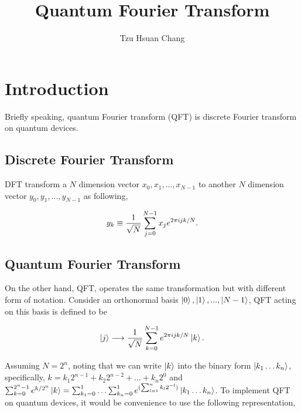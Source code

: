 \documentclass[a4paper]{article}
\title{Quantum Fourier Transform}
\author{Tzu Hsuan Chang}
\begin{document}
\maketitle

\section{Introduction}
\label{sec:Intro}
Briefly speaking, quantum Fourier transform (QFT) is discrete Fourier transform on quantum devices.


\subsection*{Discrete Fourier Transform}
\label{subsec:dft}
DFT transform a $N$ dimension vector $x_0, x_1, ... ,x_{N-1}$ to another $N$ dimension vector $y_0, y_1, ... ,y_{N-1}$ as following,

    \begin{equation} \label{eq1}
    \setlength{\jot}{10pt}
    \begin{aligned}
        \large y_k \equiv \frac{1}{\sqrt{N}} \sum_{j=0}^{N-1} x_j e^{2\pi ijk / N}.
    \end{aligned}
    \end{equation}


\subsection*{Quantum Fourier Transform}
\label{subsec:qft}
On the other hand, QFT, operates the same transformation but with different form of notation. Consider an orthonormal basis $\ket{0}, \ket{1}, ... ,\ket{N-1}$, QFT acting on this basis is defined to be

    \begin{equation} \label{eq2}
    \setlength{\jot}{10pt}
    \begin{aligned}
        \ket{j} \longrightarrow \frac{1}{\sqrt{N}} \sum_{k=0}^{N-1} e^{2 \pi i j k / N} \ket{k}.
    \end{aligned}
    \end{equation}

Assuming $N = 2^n$, noting that we can write $\ket{k}$ into the binary form 
$\ket{k_1 \dotso k_n}$, specifically, $k = k_1 2^{n-1} + k_2 2^{n-2} + \dotso + k_n 2^0$ 
and 
$\sum_{k = 0}^{2^n-1} e^{k/2^n} \ket{k} = \sum_{k_1 = 0}^{1} \dotso \sum_{k_n = 0}^{1} e^{(\sum_{l = 1}^{n} k_l 2^{-l})} \ket{k_1 \dotso k_n}$. 
To implement QFT on quantum devices, it would be convenience to use the following representation,
\end{document}
